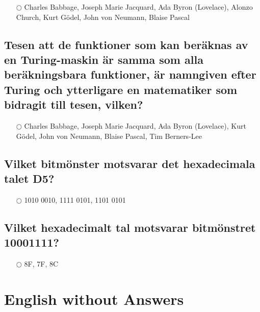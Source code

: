 \documentclass[a4paper,11pt,oneside]{article}
\begin{document}
\begin{sloppypar}
\label{q:441:mc:sv:True}

\begin{itemize}
  \item[$\bigcirc$] Charles Babbage, Joseph Marie Jacquard, Ada Byron (Lovelace), Alonzo Church, Kurt G\"odel, John von Neumann, Blaise Pascal
\end{itemize}



\subsection{Tesen att de funktioner som kan ber\"aknas av en Turing-maskin \"ar samma som alla ber\"akningsbara funktioner, \"ar namngiven efter Turing och ytterligare en matematiker som bidragit till tesen, vilken?}

\label{q:442:mc:sv:True}

\begin{itemize}
  \item[$\bigcirc$] Charles Babbage, Joseph Marie Jacquard, Ada Byron (Lovelace), Kurt G\"odel, John von Neumann, Blaise Pascal, Tim Berners-Lee
\end{itemize}



\subsection{Vilket bitm\"onster motsvarar det hexadecimala talet D5?}

\label{q:443:mc:sv:True}

\begin{itemize}
  \item[$\bigcirc$] 1010 0010, 1111 0101, 1101 0101
\end{itemize}



\subsection{Vilket hexadecimalt tal motsvarar bitm\"onstret 10001111?}

\label{q:444:mc:sv:True}

\begin{itemize}
  \item[$\bigcirc$] 8F, 7F, 8C
\end{itemize}

\section{English without Answers}
\label{englishWithoutAnswers}


\end{sloppypar}
\end{document}
